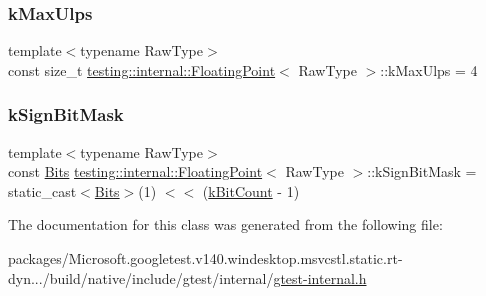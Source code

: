 \subsubsection{\texorpdfstring{kMaxUlps}{kMaxUlps}}
{\footnotesize\ttfamily template$<$typename Raw\+Type$>$ \\
const size\+\_\+t \mbox{\hyperlink{classtesting_1_1internal_1_1_floating_point}{testing\+::internal\+::\+Floating\+Point}}$<$ Raw\+Type $>$\+::k\+Max\+Ulps = 4\hspace{0.3cm}{\ttfamily [static]}}

\mbox{\label{classtesting_1_1internal_1_1_floating_point_aca98b5ea6f2222a66a82e52421682efa}} 
\subsubsection{\texorpdfstring{kSignBitMask}{kSignBitMask}}
{\footnotesize\ttfamily template$<$typename Raw\+Type$>$ \\
const \mbox{\hyperlink{classtesting_1_1internal_1_1_floating_point_abf228bf6cd48f12c8b44c85b4971a731}{Bits}} \mbox{\hyperlink{classtesting_1_1internal_1_1_floating_point}{testing\+::internal\+::\+Floating\+Point}}$<$ Raw\+Type $>$\+::k\+Sign\+Bit\+Mask = static\+\_\+cast$<$\mbox{\hyperlink{classtesting_1_1internal_1_1_floating_point_abf228bf6cd48f12c8b44c85b4971a731}{Bits}}$>$(1) $<$$<$ (\mbox{\hyperlink{classtesting_1_1internal_1_1_floating_point_ab819d2e8f93e9e482373999f0f8d71b9}{k\+Bit\+Count}} -\/ 1)\hspace{0.3cm}{\ttfamily [static]}}



The documentation for this class was generated from the following file\+:\begin{DoxyCompactItemize}
\item 
packages/\+Microsoft.\+googletest.\+v140.\+windesktop.\+msvcstl.\+static.\+rt-\/dyn.../build/native/include/gtest/internal/\mbox{\hyperlink{gtest-internal_8h}{gtest-\/internal.\+h}}\end{DoxyCompactItemize}
